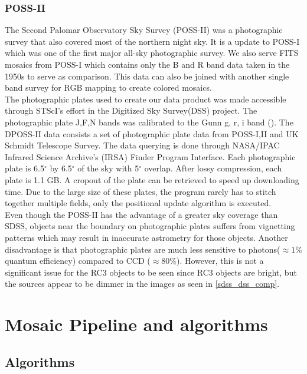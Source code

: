 \documentclass[authoryear, 12pt,5p, times]{elsarticle}
\begin{document}
	\subsubsection{POSS-II}
	The Second Palomar Observatory Sky Survey (POSS-II) was a photographic survey that also covered most of the northern night sky. It is a update to POSS-I which was one of the first major all-sky photographic survey. We also serve FITS mosaics from POSS-I which contains only the B and R band data taken in the 1950s to serve as comparison. This data can also be joined with another single band survey  for RGB mapping to create colored mosaics.
\\
\indent	The photographic plates used to create our data product was made accessible through  STScI's effort in the Digitized Sky Survey(DSS) project. The photographic plate J,F,N bands was calibrated to the Gunn g, r, i band (\citealp{dposs}). The DPOSS-II data consists a set of  photographic plate data from POSS-I,II and UK Schmidt Telescope Survey. The data querying is done  through NASA/IPAC Infrared Science Archive's  (IRSA) Finder Program Interface. Each photographic plate is 6.5$^{\circ}$ by 6.5$^{\circ}$ of the sky with 5$^{\circ}$ overlap. After lossy compression, each plate is 1.1 GB. A cropout of the plate  can be retrieved  to speed up downloading time. Due to the large size of these plates, the program rarely has to stitch together multiple fields, only the positional update algorithm is executed.
\\
\indent Even though the POSS-II has the advantage of a  greater sky coverage than SDSS, objects near the boundary on photographic plates suffers from vignetting patterns which may result in inaccurate astrometry for those objects.	Another disadvantage is that photographic plates are much less sensitive to photons($\approx 1\%$ quantum efficiency) compared to  CCD  ($\approx 80\%$). However, this is not a significant issue for the RC3 objects to be seen since RC3 objects are bright, but the sources appear to be dimmer in the images as seen in \autoref{sdss_dss_comp}. 


\section{Mosaic Pipeline and algorithms\label{mosaic-sec}}

\subsection{Algorithms}
\end{document}
